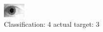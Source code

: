 \begin{figure}[h!]
\begin{center}
\includegraphics[width=0.60\columnwidth]{figures/ID1912_class_4_target_3.png}
\end{center}
\caption{ Classification: 4 actual target: 3}
\label{fig:ID1912_class_4_target_3}
\end{figure}
